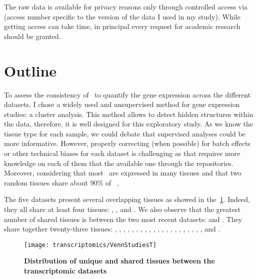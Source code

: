 The raw data is available for privacy reasons only through controlled access via
 (access number specific to the version of the data I used
in my study). While getting access can take time, in principal every request for
academic research should be granted.

\section{Outline}

To assess the consistency of \Rnaseq\ to quantify the gene expression across
the different datasets, I chose a widely used and unsupervised method for gene
expression studies: a cluster analysis. This method allows to detect hidden
structures within the data, therefore, it is well designed for this exploratory
study. As we know the tissue type for each sample, we could debate that supervised
analyses could be more informative. However, properly correcting (when possible)
for batch effects or other technical biases for each dataset is
challenging as that requires more knowledge on each of them that
the available one through the repositories.
Moreover, considering that most \mRNAs\ are expressed in many tissues
and that two random tissues share about 90\% of \mRNAs\ \citep{ramskoldan:2009},





The five datasets present several overlapping tissues as showed in
the~\cref{fig:VennStudiesT}. Indeed, they all share at least four tissues:
, ,  and . We also
observe that the greatest number of shared tissues is between the two most recent
datasets:  and . They share together twenty-three
tissues: , , ,
, , ,
, , , ,
, , , ,
, , ,
, , , ,
 and .


\begin{figure}[!htbp]
    \texttt{[image: transcriptomics/VennStudiesT]}\centering
    \caption[Distribution of unique and shared tissues between the
    transcriptomic datasets]%
    {\label{fig:VennStudiesT}\textbf{Distribution of unique and shared tissues
    between the transcriptomic datasets}}
\end{figure}

